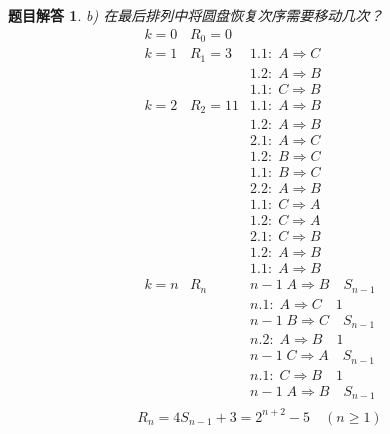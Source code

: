 \documentclass[mode=geye]{elegantnote}
\newtheorem{answer}{题目解答}
\begin{document}
\begin{answer}
	b) 在最后排列中将圆盘恢复次序需要移动几次？
	\begin{equation*}
		\begin{array}{lll}
			k=0	& R_0=0		&	\\
			k=1	& R_1=3		& 1.1:\; A \Rightarrow C\\
				&			& 1.2:\; A \Rightarrow B\\
				&			& 1.1:\; C \Rightarrow B\\
			k=2	& R_2=11	& 1.1:\; A \Rightarrow B\\
				&			& 1.2:\; A \Rightarrow B\\
				&			& 2.1:\; A \Rightarrow C\\
				&			& 1.2:\; B \Rightarrow C\\
				&			& 1.1:\; B \Rightarrow C\\
				&			& 2.2:\; A \Rightarrow B\\
				&			& 1.1:\; C \Rightarrow A\\
				&			& 1.2:\; C \Rightarrow A\\
				&			& 2.1:\; C \Rightarrow B\\
				&			& 1.2:\; A \Rightarrow B\\
				&			& 1.1:\; A \Rightarrow B\\
			k=n	& R_n 		& n-1\;  			A \Rightarrow B\quad S_{n-1}\\
				&			& n.1:\; 			A \Rightarrow C\quad 1		\\	
				&			& n-1\; 			B \Rightarrow C\quad S_{n-1}\\	
				&			& n.2:\; 			A \Rightarrow B\quad 1		\\	
				&			& n-1\; 			C \Rightarrow A\quad S_{n-1}\\	
				&			& n.1:\; 			C \Rightarrow B\quad 1		\\
				&			& n-1\;  			A \Rightarrow B\quad S_{n-1}\\
		\end{array}
	\end{equation*}
\begin{equation*}
	R_n = 4S_{n-1}+3 = 2^{n+2}-5 \quad(n\geqslant 1)
\end{equation*}
\end{answer}
\end{document}
